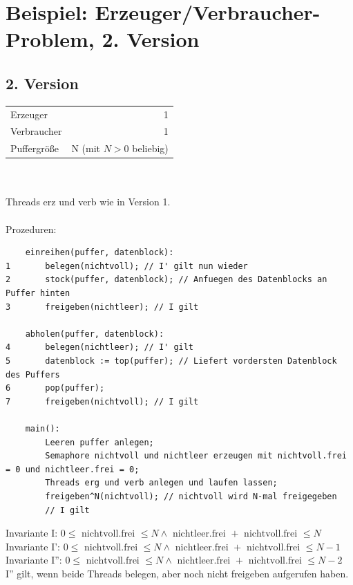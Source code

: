 \section[Beispiel: Erzeuger/Verbraucher (2)]{Beispiel: Erzeuger/Verbraucher-Problem, 2. Version}

\subsection*{2. Version}
\begin{tabular}{l r}
	Erzeuger & 1\\
	Verbraucher & 1\\
	Puffergröße & N (mit $N > 0$ beliebig)
\end{tabular}\\
\\
Threads erz und verb wie in Version 1.\\
\\
Prozeduren:
\begin{lstlisting}
	einreihen(puffer, datenblock):
1		belegen(nichtvoll); // I' gilt nun wieder
2		stock(puffer, datenblock); // Anfuegen des Datenblocks an Puffer hinten
3		freigeben(nichtleer); // I gilt
	
	abholen(puffer, datenblock):
4		belegen(nichtleer); // I' gilt
5		datenblock := top(puffer); // Liefert vordersten Datenblock des Puffers
6		pop(puffer);
7		freigeben(nichtvoll); // I gilt

	main():
		Leeren puffer anlegen;
		Semaphore nichtvoll und nichtleer erzeugen mit nichtvoll.frei = 0 und nichtleer.frei = 0;
		Threads erg und verb anlegen und laufen lassen;
		freigeben^N(nichtvoll); // nichtvoll wird N-mal freigegeben
		// I gilt
\end{lstlisting}

Invariante I: $ 0 \leq \text{ nichtvoll.frei } \leq N \land \text{ nichtleer.frei } + \text{ nichtvoll.frei } \leq N $\\
Invariante I': $ 0 \leq \text{ nichtvoll.frei } \leq N \land \text{ nichtleer.frei } + \text{ nichtvoll.frei } \leq N - 1 $\\
Invariante I'': $ 0 \leq \text{ nichtvoll.frei } \leq N \land \text{ nichtleer.frei } + \text{ nichtvoll.frei } \leq N - 2 $\\
I'' gilt, wenn beide Threads belegen, aber noch nicht freigeben aufgerufen haben.

